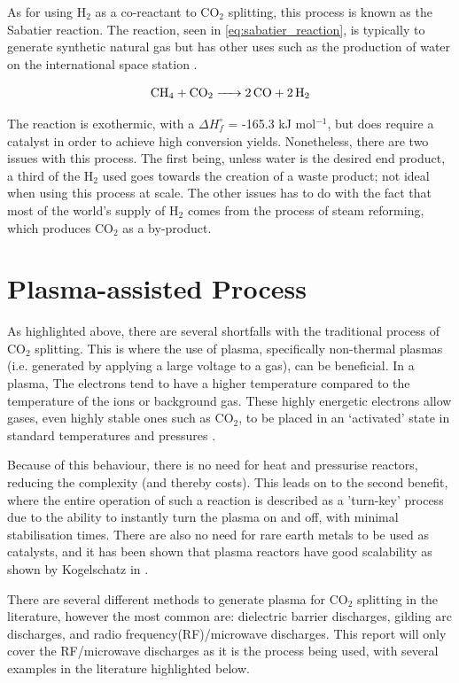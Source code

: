 As for using H$_2$ as a co-reactant to CO$_2$ splitting, this process is known as the Sabatier reaction. The reaction, seen in \ref{eq:sabatier_reaction}, is typically to generate synthetic natural gas but has other uses such as the production of water on the international space station \cite{the_sabatier_system}.

\begin{equation}
    \ce{CH_4 + CO_2 -> 2CO + 2H_2}
    \label{eq:sabatier_reaction}
\end{equation}

The reaction is exothermic, with a $\Delta H^\circ_f$ = -165.3 kJ mol$^{-1}$, but does require a catalyst in order to achieve high conversion yields. Nonetheless, there are two issues with this process. The first being, unless water is the desired end product, a third of the H$_2$ used goes towards the creation of a waste product; not ideal when using this process at scale. The other issues has to do with the fact that most of the world's supply of H$_2$ comes from the process of steam reforming, which produces CO$_2$ as a by-product. 

\section{Plasma-assisted Process}

As highlighted above, there are several shortfalls with the traditional process of CO$_2$ splitting. This is where the use of plasma, specifically non-thermal plasmas (i.e. generated by applying a large voltage to a gas), can be beneficial. In a plasma, The electrons tend to have a higher temperature compared to the temperature of the ions or background gas. These highly energetic electrons allow gases, even highly stable ones such as CO$_2$, to be placed in an `activated' state in standard temperatures and pressures \cite{Snoeckx2017}. 

Because of this behaviour, there is no need for heat and pressurise reactors, reducing the complexity (and thereby costs). This leads on to the second benefit, where the entire operation of such a reaction is described as a 'turn-key' process due to the ability to instantly turn the plasma on and off, with minimal stabilisation times. There are also no need for rare earth metals to be used as catalysts, and it has been shown that plasma reactors have good scalability as shown by Kogelschatz in \cite{kogelschatz_2003}.  

There are several different methods to generate plasma for CO$_2$ splitting in the literature, however the most common are: dielectric barrier discharges, gilding arc discharges, and radio frequency(RF)/microwave discharges. This report will only cover the RF/microwave discharges as it is the process being used, with several examples in the literature highlighted below.


